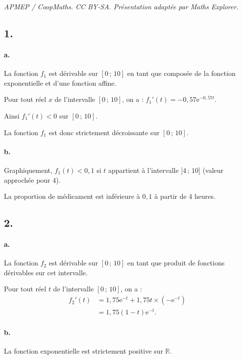 \documentclass[10pt]{article}
\providecommand{\e}{{\mathrm{e}}}
\begin{document}
\noindent\textit{APMEP / CoopMaths. CC BY-SA. Présentation adaptée par Maths Explorer.}\par\medskip
\subsection*{1.}

\paragraph{a.} La fonction \( f_1 \) est dérivable sur \([0\,;\,10]\) en tant que composée de la fonction exponentielle et d'une fonction affine.

Pour tout réel \( x \) de l'intervalle \([0\,;\,10]\), on a : \( f_1'(t) = -0{,}57 \e^{-0{,}57t} \).

Ainsi \( f_1'(t) < 0 \) sur \([0\,;\,10]\).

La fonction \( f_1 \) est donc strictement décroissante sur \([0\,;\,10]\).

\paragraph{b.} Graphiquement, \( f_1(t) < 0{,}1 \) si \( t \) appartient à l'intervalle \( ]4\,;\,10] \) (valeur approchée pour 4).

La proportion de médicament est inférieure à \(0{,}1\) à partir de 4 heures.

\subsection*{2.}

\paragraph{a.} La fonction \( f_2 \) est dérivable sur \([0\,;\,10]\) en tant que produit de fonctions dérivables sur cet intervalle.

Pour tout réel \( t \) de l'intervalle \([0\,;\,10]\), on a :
\begin{align*}
f_2'(t) &= 1{,}75 \e^{-t} + 1{,}75t \times (-\e^{-t}) \\
&= 1{,}75 (1 - t) \e^{-t}.
\end{align*}

\paragraph{b.} La fonction exponentielle est strictement positive sur \( \mathbb{R} \).
\end{document}
